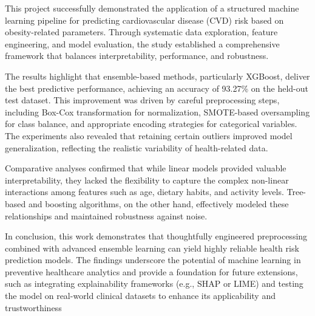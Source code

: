 
This project successfully demonstrated the application of a structured machine learning pipeline for predicting cardiovascular disease (CVD) risk based on obesity-related parameters.
Through systematic data exploration, feature engineering, and model evaluation, the study established a comprehensive framework that balances interpretability, performance, and robustness.

The results highlight that ensemble-based methods, particularly XGBoost, deliver the best predictive performance, achieving an accuracy of 93.27\% on the held-out test dataset.
This improvement was driven by careful preprocessing steps, including Box-Cox transformation for normalization, SMOTE-based oversampling for class balance, and appropriate encoding strategies for categorical variables.
The experiments also revealed that retaining certain outliers improved model generalization, reflecting the realistic variability of health-related data.

Comparative analyses confirmed that while linear models provided valuable interpretability, they lacked the flexibility to capture the complex non-linear interactions among features such as age, dietary habits, and activity levels.
Tree-based and boosting algorithms, on the other hand, effectively modeled these relationships and maintained robustness against noise.

In conclusion, this work demonstrates that thoughtfully engineered preprocessing combined with advanced ensemble learning can yield highly reliable health risk prediction models.
The findings underscore the potential of machine learning in preventive healthcare analytics and provide a foundation for future extensions, such as integrating explainability frameworks (e.g., SHAP or LIME) and testing the model on real-world clinical datasets to enhance its applicability and trustworthiness